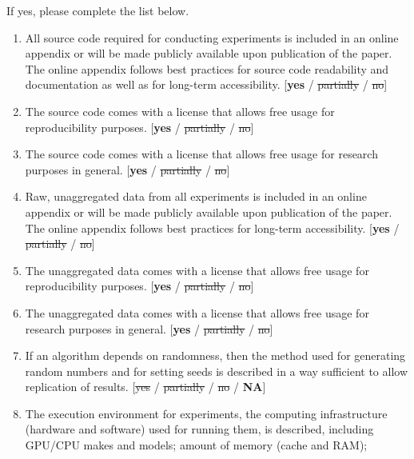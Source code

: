 \documentclass[]{jair}
\renewcommand{\bf}[1]{\textbf{#1}}  %
\begin{document}
If yes, please complete the list below.
\begin{enumerate}
    \item 
    All source code required for conducting experiments is included in an online appendix 
    or will be made publicly available upon publication of the paper.
    The online appendix follows best practices for source code readability 
    and documentation as well as for long-term accessibility. \newline
    [\bf{yes} / \st{partially} / \st{no}]
    \item The source code comes with a license that 
    allows free usage for reproducibility purposes. \newline
    [\bf{yes} / \st{partially} / \st{no}]
    \item The source code comes with a license that
    allows free usage for research purposes in general. \newline
    [\bf{yes} / \st{partially} / \st{no}]
    \item 
    Raw, unaggregated data from all experiments is included in an online appendix 
    or will be made publicly available upon publication of the paper.
    The online appendix follows best practices for long-term accessibility. \newline
    [\bf{yes} / \st{partially} / \st{no}]
    \item The unaggregated data comes with a license that
    allows free usage for reproducibility purposes. \newline
    [\bf{yes} / \st{partially} / \st{no}]
    \item The unaggregated data comes with a license that
    allows free usage for research purposes in general. \newline
    [\bf{yes} / \st{partially} / \st{no}]
    \item If an algorithm depends on randomness, 
    then the method used for generating random numbers and for setting seeds is 
    described in a way sufficient to allow replication of results. \newline
    [\st{yes} / \st{partially} / \st{no} / \bf{NA}]
    \item The execution environment for experiments, the computing infrastructure 
    (hardware and software) used for running them, is described, 
    including GPU/CPU makes and models; amount of memory (cache and RAM); 

\end{enumerate}
\end{document}
